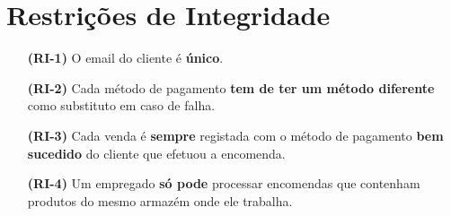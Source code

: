 \documentclass[12pt, a4paper]{article}
\begin{document}
  \section*{Restrições de Integridade}
  \footnotesize
  \begin{itemize}
    \item[\textbf{(RI-1)}] O email do cliente é \textbf{único}.
    \item[\textbf{(RI-2)}] Cada método de pagamento \textbf{tem de ter um método diferente} como substituto em caso de falha.
    \item[\textbf{(RI-3)}] Cada venda é \textbf{sempre} registada com o método de pagamento \textbf{bem sucedido} do cliente que efetuou a encomenda.
    \item[\textbf{(RI-4)}] Um empregado \textbf{só pode} processar encomendas que contenham produtos do mesmo armazém onde ele trabalha.
  \end{itemize}
\end{document}
